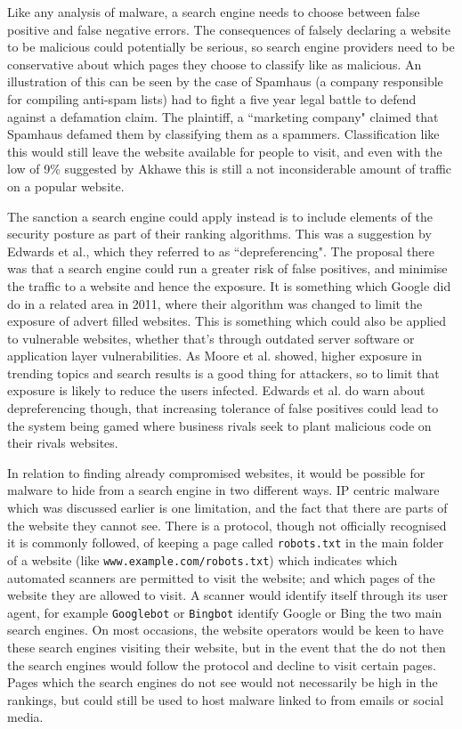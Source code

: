 \documentclass{acm_proc_article-sp}
\begin{document}
Like any analysis of malware, a search engine needs to choose between false positive and false negative errors.  The consequences of falsely declaring a website to be malicious could potentially be serious, so search engine providers need to be conservative about which pages they choose to classify like as malicious.  An illustration of this can be seen by the case of Spamhaus (a company responsible for compiling anti-spam lists) had to fight a five year legal battle to defend against a defamation claim.  The plaintiff, a ``marketing company" claimed that Spamhaus defamed them by classifying them as a spammers.  Classification like this would still leave the website available for people to visit, and even with the low of 9\% suggested by Akhawe\cite{akhawe2013} this is still a not inconsiderable amount of traffic on a popular website.

The sanction a search engine could apply instead is to include elements of the security posture as part of their ranking algorithms.  This was a suggestion by Edwards et al., which they referred to as ``depreferencing"\cite{edwards2012}.  The proposal there was that a search engine could run a greater risk of false positives, and minimise the traffic to a website and hence the exposure.  It is something which Google did do in a related area in 2011, where their algorithm was changed to limit the exposure of advert filled websites\cite{fashion}.  This is something which could also be applied to vulnerable websites, whether that's through outdated server software or application layer vulnerabilities.  As Moore et al. showed, higher exposure in trending topics and search results is a good thing for attackers\cite{fashion}, so to limit that exposure is likely to reduce the users infected.  Edwards et al. do warn about depreferencing though, that increasing tolerance of false positives could lead to the system being gamed where business rivals seek to plant malicious code on their rivals websites\cite{edwards2012}.

In relation to finding already compromised websites, it would be possible for malware to hide from a search engine in two different ways.  IP centric malware which was discussed earlier is one limitation, and the fact that there are parts of the website they cannot see.  There is a protocol, though not officially recognised it is commonly followed, of keeping a page called \texttt{robots.txt} in the main folder of a website (like \texttt{www.example.com/robots.txt}) which indicates which automated scanners are permitted to visit the website; and which pages of the website they are allowed to visit.  A scanner would identify itself through its user agent, for example \texttt{Googlebot} or \texttt{Bingbot} identify Google or Bing the two main search engines.  On most occasions, the website operators would be keen to have these search engines visiting their website, but in the event that the do not then the search engines would follow the protocol and decline to visit certain pages.  Pages which the search engines do not see would not necessarily be high in the rankings, but could still be used to host malware linked to from emails or social media.
\end{document}
